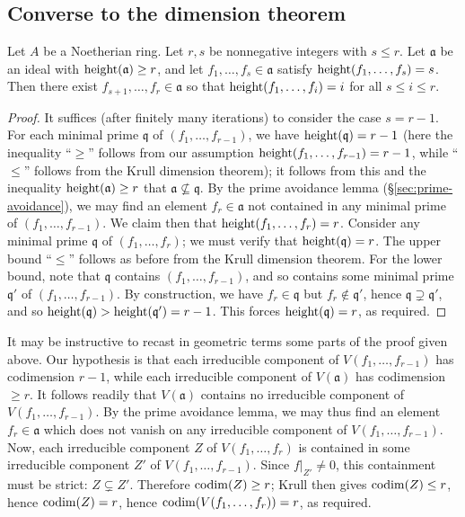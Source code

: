 \documentclass[reqno]{amsart}
\begin{document}
\subsection{Converse to the dimension theorem}
\label{sec:org858899e}

\begin{theorem}\label{thm:conv-to-krull-1}
Let $A$ be a Noetherian ring.
Let $r,s$ be nonnegative integers
with $s \leq r$.
Let $\mathfrak{a}$ be an ideal with $\operatorname{height}(\mathfrak{a})
\geq r$,
and let
$f_1,\dotsc,f_s \in \mathfrak{a}$
satisfy
$\operatorname{height}(f_1,\dotsc,f_s) = s$.
Then there exist $f_{s+1},\dotsc,f_r \in \mathfrak{a}$
so that
$\operatorname{height}(f_1,\dotsc,f_i) = i$
for all $s \leq i \leq r$.
\end{theorem}
\begin{proof}
  It suffices (after finitely many iterations) to consider the
  case $s = r-1$.  For each minimal prime $\mathfrak{q}$ of
  $(f_1,\dotsc,f_{r-1})$, we have $\operatorname{height}(\mathfrak{q}) = r-1$
  (here the inequality ``$\geq$'' follows from our assumption
  $\operatorname{height}(f_1,\dotsc,f_{r-1}) = r-1$, while ``$\leq$'' follows
  from the Krull dimension theorem);
  it follows from this
  and the inequality
  $\operatorname{height}(\mathfrak{a}) \geq r$
  that $\mathfrak{a} \not\subseteq \mathfrak{q}$.
  By the prime avoidance lemma (\S\ref{sec:prime-avoidance}),
  we may find an element $f_r \in \mathfrak{a}$ not contained in
  any minimal prime
  of $(f_1,\dotsc,f_{r-1})$.
  We claim then that $\operatorname{height}(f_1,\dotsc,f_r) = r$.
  Consider any minimal prime $\mathfrak{q}$ of
  $(f_1,\dotsc,f_r)$;
  we must verify that $\operatorname{height}(\mathfrak{q}) = r$.
  The upper bound ``$\leq$'' follows
  as before from the Krull dimension theorem.
  For the lower bound,
  note that $\mathfrak{q}$ contains $(f_1,\dotsc,f_{r-1})$,
  and so contains some minimal prime $\mathfrak{q} '$ of
  $(f_1,\dotsc,f_{r-1})$.
  By construction, we have $f_r \in \mathfrak{q}$
  but $f_r \notin \mathfrak{q} '$,
  hence $\mathfrak{q} \supsetneq \mathfrak{q} '$,
  and so $\operatorname{height}(\mathfrak{q}) > \operatorname{height}(\mathfrak{q} ')= r-1$.
  This forces $\operatorname{height}(\mathfrak{q}) = r$, as required.
\end{proof}
\begin{remark}
  It may be instructive
  to recast in geometric terms
  some parts of the proof given above.
  Our hypothesis is that each irreducible
  component of $V(f_1,\dotsc,f_{r-1})$ has codimension $r-1$,
  while each irreducible component of $V(\mathfrak{a})$ has
  codimension
  $\geq r$.
  It follows readily that $V(\mathfrak{a})$ contains
  no irreducible component of $V(f_1,\dotsc,f_{r-1})$.
  By the prime avoidance lemma,
  we may thus find an element $f_r \in \mathfrak{a}$
  which does not vanish on any irreducible component
  of $V(f_1,\dotsc,f_{r-1})$.
  Now, each irreducible component $Z$ of $V(f_1,\dotsc,f_r)$
  is contained in some irreducible component $Z'$ of
  $V(f_1,\dotsc,f_{r-1})$.
  Since $f|_{Z'} \neq 0$,
  this containment must be strict: $Z \subsetneq Z'$.
  Therefore $\operatorname{codim}(Z) \geq r$;
  Krull then gives $\operatorname{codim}(Z) \leq r$,
  hence $\operatorname{codim}(Z) = r$,
  hence $\operatorname{codim}(V(f_1,\dotsc,f_r)) = r$, as required.
\end{remark}
\end{document}
